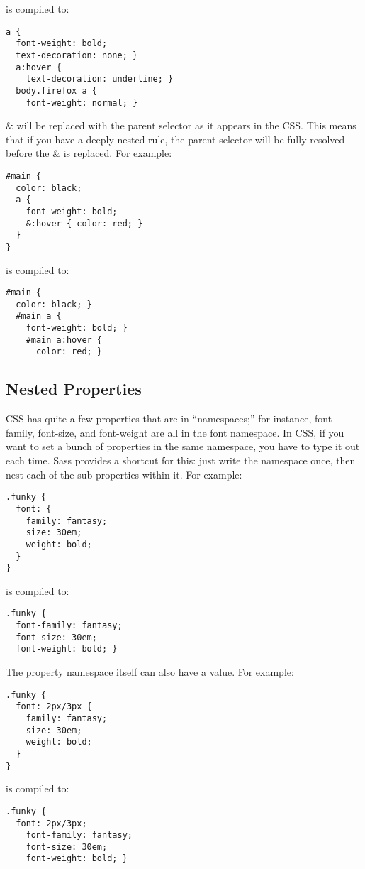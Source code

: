 \documentclass[10pt]{article}
\begin{document}
 is compiled to:
\begin{verbatim}
a {
  font-weight: bold;
  text-decoration: none; }
  a:hover {
    text-decoration: underline; }
  body.firefox a {
    font-weight: normal; }
\end{verbatim}


 \& will be replaced with the parent selector as it appears in the CSS. This means that if you have a deeply nested rule, the parent selector will be fully resolved before the \& is replaced. For example:
\begin{verbatim}
#main {
  color: black;
  a {
    font-weight: bold;
    &:hover { color: red; }
  }
}
\end{verbatim}


 is compiled to:
\begin{verbatim}
#main {
  color: black; }
  #main a {
    font-weight: bold; }
    #main a:hover {
      color: red; }
\end{verbatim}
\subsection{Nested Properties}


 CSS has quite a few properties that are in “namespaces;” for instance, font-family, font-size, and font-weight are all in the font namespace. In CSS, if you want to set a bunch of properties in the same namespace, you have to type it out each time. Sass provides a shortcut for this: just write the namespace once, then nest each of the sub-properties within it. For example:
\begin{verbatim}
.funky {
  font: {
    family: fantasy;
    size: 30em;
    weight: bold;
  }
}
\end{verbatim}


 is compiled to:
\begin{verbatim}
.funky {
  font-family: fantasy;
  font-size: 30em;
  font-weight: bold; }
\end{verbatim}


 The property namespace itself can also have a value. For example:
\begin{verbatim}
.funky {
  font: 2px/3px {
    family: fantasy;
    size: 30em;
    weight: bold;
  }
}
\end{verbatim}


 is compiled to:
\begin{verbatim}
.funky {
  font: 2px/3px;
    font-family: fantasy;
    font-size: 30em;
    font-weight: bold; }
\end{verbatim}
\end{document}
